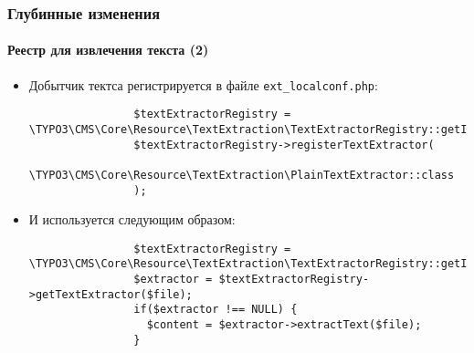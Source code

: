 \begin{frame}[fragile]
	\frametitle{Глубинные изменения}
	\framesubtitle{Реестр для извлечения текста (2)}

	\lstset{basicstyle=\tiny\ttfamily}

	\begin{itemize}

		\item Добытчик тектса регистрируется в файле \texttt{ext\_localconf.php}:

			\begin{lstlisting}
				$textExtractorRegistry = \TYPO3\CMS\Core\Resource\TextExtraction\TextExtractorRegistry::getInstance();
				$textExtractorRegistry->registerTextExtractor(
				  \TYPO3\CMS\Core\Resource\TextExtraction\PlainTextExtractor::class
				);
			\end{lstlisting}

		\item И используется следующим образом:

			\begin{lstlisting}
				$textExtractorRegistry = \TYPO3\CMS\Core\Resource\TextExtraction\TextExtractorRegistry::getInstance();
				$extractor = $textExtractorRegistry->getTextExtractor($file);
				if($extractor !== NULL) {
				  $content = $extractor->extractText($file);
				}
			\end{lstlisting}
	\end{itemize}

\end{frame}


